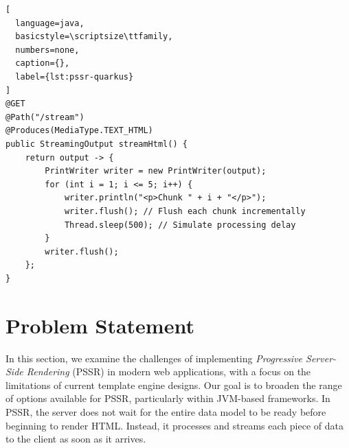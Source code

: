\documentclass[software,article,accept,pdftex,moreauthors]{Definitions/mdpi}
\begin{document}
\vspace{-3pt}
\begin{listing}[H]
\caption{Progressive Server-Side Rendering in Quarkus using StreamingOutput.}
\begin{lstlisting}[
  language=java,
  basicstyle=\scriptsize\ttfamily,
  numbers=none,
  caption={},
  label={lst:pssr-quarkus}
]
@GET
@Path("/stream")
@Produces(MediaType.TEXT_HTML)
public StreamingOutput streamHtml() {
    return output -> {
        PrintWriter writer = new PrintWriter(output);
        for (int i = 1; i <= 5; i++) {
            writer.println("<p>Chunk " + i + "</p>");
            writer.flush(); // Flush each chunk incrementally
            Thread.sleep(500); // Simulate processing delay
        }
        writer.flush();
    };
}
\end{lstlisting}
\end{listing}


\section{Problem Statement}\label{s3}

In this section, we examine the challenges of implementing \textit{Progressive
Server-Side Rendering} (PSSR) in modern web applications, with a focus on the
limitations of current template engine designs. Our goal is to broaden the
range of options available for PSSR, particularly within JVM-based frameworks.
In PSSR, the server does not
wait for the entire data model to be ready before beginning to render HTML.
Instead, it processes and streams each piece of data to the client as soon as
it arrives. 
\end{document}
